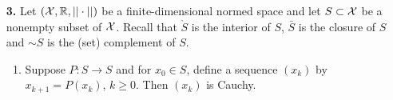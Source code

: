 \documentclass[letterpaper]{article}
\newcommand{\real}{\mathbb R}  %
\newcommand{\spanof}[1]{\textrm{span} \{ #1 \}}
\begin{document}
\begin{enumerate}
\begin{enumerate}
\setlength{\itemsep}{.3cm}
\renewcommand{\labelenumi}{(\alph{enumi})}

 \item $\frac{2}{3}\left[ \begin{array}{rr} 1 & -1 \\ 1 & 0 \end{array} \right]= \underset{<x,y_1>=2} { {\rm arg}~ \min}~ ||x||.$


\item Let $x_0=\left[ \begin{array}{rr} 1 & 2 \\ 3& 4\end{array} \right]$ and $M=\spanof{y_1}$. Then  $\frac{2}{3}\left[ \begin{array}{rr} 1 & -1 \\ 1 & 0 \end{array} \right]= \underset{y\in M } { {\rm arg}~ \min}~ ||x_0-y||.$


 \item Let  $M=\spanof{y_1}$. Then, $M^\perp = \spanof{ \left[ \begin{array}{rr} 0 & 1 \\ 1 & 0 \end{array} \right], \left[ \begin{array}{rr} 1 & 2 \\ 1 & 0 \end{array} \right] }$.


\item There exists a \underline{symmetric} matrix $A\in {\cal X}$ such that $<A,y_1>=0$ and rank of $A$ is two.

\end{enumerate}

\newpage

\begin{center}
\vspace*{6cm}

{\bf \LARGE Page Intentionally Left Blank}\\

\vspace*{3cm}
\textbf{Anything written here will not be graded.}

\textbf{(You can use it for scratch paper.)}

\end{center}


\newpage
\item[{\bf 3.}]  Let $({\cal X}, \real, ||\cdot||)$ be a finite-dimensional normed space and let $S \subset {\cal X}$ be a nonempty subset of ${\cal X}$. Recall that $\mathring{S}$ is the interior of $S$, $\bar{S}$ is the closure of $S$ and $\sim S$ is the (set) complement of $S$.
\begin{enumerate}
\setlength{\itemsep}{.15in}
\renewcommand{\labelenumi}{(\alph{enumi})}
\setlength{\itemsep}{.1in}
\item Suppose $P:S \to S$ and for  $x_0\in S$, define a sequence $(x_k)$ by $x_{k+1}=P(x_k)$, $k \ge0$. Then $(x_k)$ is Cauchy.




\end{enumerate}
\end{enumerate}
\end{document}
